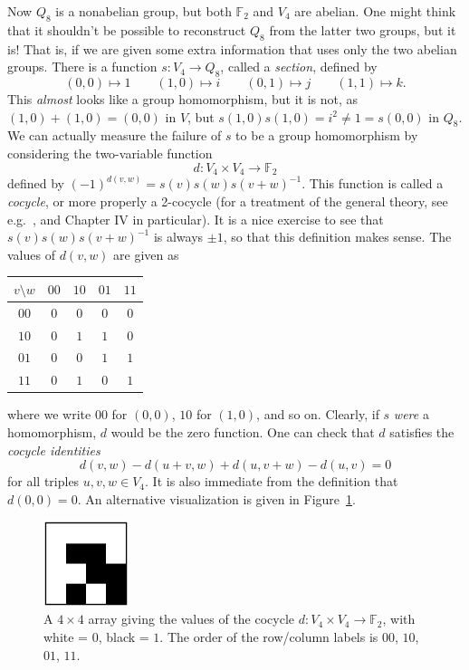 \documentclass{article}
\theoremstyle{plain}
\theoremstyle{definition}
\def \FF {\mathbb{F}}
\begin{document}
Now $Q_8$ is a nonabelian group, but both $\FF_2$ and $V_4$ are abelian.
One might think that it shouldn't be possible to reconstruct $Q_8$ from the latter two groups, but it is! 
That is, if we are given some extra information that uses only the two abelian groups.
There is a function $s\colon V_4 \to Q_8$, called a \emph{section}, defined by 
\[
(0,0) \mapsto 1\qquad
(1,0) \mapsto i\qquad
(0,1) \mapsto j\qquad
(1,1) \mapsto k.
\]
This \emph{almost} looks like a group homomorphism, but it is not, as $(1,0) + (1,0) = (0,0)$ in $V$, but $s(1,0)s(1,0) = i^2 \not= 1 = s(0,0)$ in $Q_8$.
We can actually measure the failure of $s$ to be a group homomorphism by considering the two-variable function
\[
	d\colon V_4 \times V_4 \to \FF_2
\]
defined by $ (-1)^{d(v,w)} = s(v)s(w)s(v+w)^{-1}$. 
This function is called a \emph{cocycle}, or more properly a 2-cocycle (for a treatment of the general theory, see e.g.\ \cite{Brown}, and Chapter IV in particular).
It is a nice exercise to see that $s(v)s(w)s(v+w)^{-1}$ is always $\pm 1$, so that this definition makes sense. The values of $d(v,w)$ are given as

\begin{center}
\begin{tabular*}{0.35\textwidth}{c|cccc}
$v\setminus w$&$00$&$10$&$01$&$11$\\
\hline
	$00$		& $0$& $0$& $0$& $0$\\
	$10$		& $0$& $1$& $1$& $0$\\
	$01$		& $0$& $0$& $1$& $1$\\
	$11$		& $0$& $1$& $0$& $1$\\
\end{tabular*}
\end{center}
where we write $00$ for $(0,0)$, $10$ for $(1,0)$, and so on.
Clearly, if $s$ \emph{were} a homomorphism, $d$ would be the zero function.
One can check that $d$ satisfies the \emph{cocycle identities}
\begin{equation}\label{eq:cocycle_eqn}
	d(v,w)-d(u+v,w)+d(u,v+w)-d(u,v) = 0
\end{equation}
for all triples $u,v,w\in V_4$. 
It is also immediate from the definition that $d(0,0)=0$.
An alternative visualization is given in Figure~\ref{fig:cocycle for q8}.

\begin{figure}[!ht]
\begin{center}
\includegraphics[height=2.5cm]{quaternion_cocyc} %
\end{center}
\caption{A $4\times4$ array giving the values of the cocycle $d\colon V_4\times V_4\to \FF_2$, with white = $0$, black = $1$. The order of the row/column labels is $00$, $10$, $01$, $11$.}
\label{fig:cocycle for q8}
\end{figure}
\end{document}
